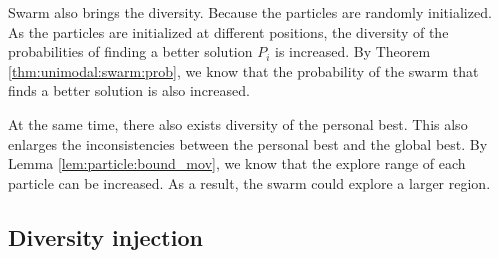 Swarm also brings the diversity.
Because the particles are randomly initialized.
As the particles are initialized at different positions, the diversity of the probabilities of finding a better solution $ P_{i} $ is increased.
By Theorem \ref{thm:unimodal:swarm:prob}, we know that the probability of the swarm that finds a better solution is also increased.

At the same time, there also exists diversity of the personal best.
This also enlarges the inconsistencies between the personal best and the global best.
By Lemma \ref{lem:particle:bound_mov}, we know that the explore range of each particle can be increased.
As a result, the swarm could explore a larger region.


\subsection{Diversity injection}

